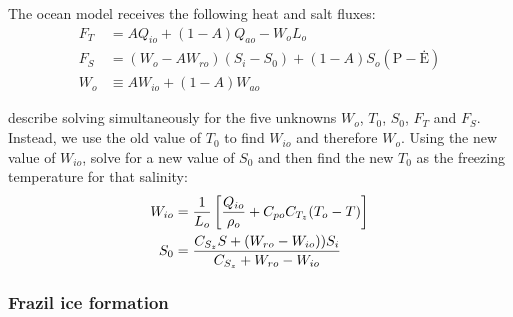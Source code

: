 The ocean model receives the following heat and salt fluxes:
\begin{align}
   F_T & = A Q_{io} + (1 - A) Q_{ao} - W_o L_o \\
   F_S & = (W_o - A W_{ro}) (S_i-S_0) + (1-A)S_o (\mbox{\.P}-\mbox{\.E}) \\
   W_o & \equiv A W_{io} + (1-A) W_{ao}
\end{align}

\citep{Mellor89} describe solving simultaneously for
the five unknowns $W_o$, $T_0$, $S_0$, $F_T$ and $F_S$. Instead, we use
the old value of $T_0$ to find $W_{io}$ and therefore $W_o$. Using the
new value of $W_{io}$, solve for a new value of $S_0$ and then find the
new $T_0$ as the freezing temperature for that salinity:
\begin{align}
   W_{io} &= {1 \over L_o} \left[ {Q_{io} \over \rho_o} + C_{po}
   C_{T_z} (T_o - T) \right] \\
   S_0 &= { C_{S_z} S + (W_{ro} - W_{io})) S_i \over
   C_{S_z} + W_{ro} - W_{io} }
\end{align}

\subsubsection{Frazil ice formation}
\label{frazil}

